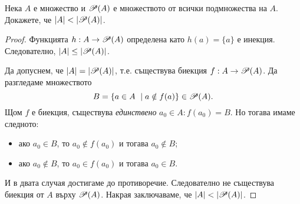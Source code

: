 \begin{thm}
  Нека $A$ е множество и $\mathscr{P}(A)$ е множеството от всички подмножества на $A$.
  Докажете, че $|A| < |\mathscr{P}(A)|$.
\end{thm}
\begin{proof}
  Функцията $h:A \to \mathscr{P}(A)$ определена като $h(a) = \{a\}$ е инекция.
  Следователно, $\lvert{A}\rvert \leq \lvert{\mathscr{P}(A)}\rvert$.

  Да допуснем, че $\lvert{A}\rvert = \lvert{\mathscr{P}(A)}\rvert$, т.е. 
  съществува биекция $f:A\rightarrow \mathscr{P}(A)$.
  Да разгледаме множеството \[B=\{a\in A\ \mid a\notin f(a)\}\in\mathscr{P}(A).\]
  Щом $f$ е биекция, съществува {\em единствено} $a_0\in A: f(a_0) = B$.
  Но тогава имаме следното:
  \begin{itemize}
  \item
    ако $a_0\in B$, то $a_0 \not\in f(a_0)$ и тогава $a_0\not\in B$;
  \item
    ако $a_0\not\in B$, то $a_0 \in f(a_0)$ и тогава $a_0\in B$.
  \end{itemize}
  И в двата случая достигаме до противоречие.
  Следователно не съществува биекция от $A$ върху $\mathscr{P}(A)$.
  Накрая заключаваме, че $\lvert{A}\rvert < \lvert{\mathscr{P}(A)}\rvert$.
\end{proof}

